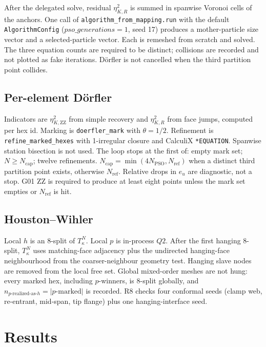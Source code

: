 \documentclass[applsci,article,submit,pdftex,oneauthor]{Definitions/mdpi}
\begin{document}
After the delegated solve, residual $\eta_{K,R}^2$ is summed in spanwise Voronoi cells of the anchors. One call of \texttt{algorithm\_from\_mapping.run} with the default \texttt{AlgorithmConfig} ($pso\_generations=1$, seed 17) produces a mother-particle size vector and a selected-particle vector. Each is remeshed from scratch and solved. The three equation counts are required to be distinct; collisions are recorded and not plotted as fake iterations. D{\"o}rfler is not cancelled when the third partition point collides.

\subsection{Per-element D{\"o}rfler}

Indicators are $\eta_{K,\mathrm{ZZ}}^2$ from simple recovery and $\eta_{K,R}^2$ from face jumps, computed per hex id. Marking is \texttt{doerfler\_mark} with $\theta=1/2$. Refinement is \texttt{refine\_marked\_hexes} with 1-irregular closure and CalculiX \texttt{*EQUATION}. Spanwise station bisection is not used. The loop stops at the first of: empty mark set; $N\ge N_{\mathrm{cap}}$; twelve refinements. $N_{\mathrm{cap}}=\min(4N_{\mathrm{PSO}},N_{\mathrm{ref}})$ when a distinct third partition point exists, otherwise $N_{\mathrm{ref}}$. Relative drops in $e_u$ are diagnostic, not a stop. G01 ZZ is required to produce at least eight points unless the mark set empties or $N_{\mathrm{ref}}$ is hit.

\subsection{Houston--Wihler}

Local $h$ is an 8-split of $T_\kappa^N$. Local $p$ is in-process $Q2$. After the first hanging 8-split, $T_\kappa^N$ uses matching-face adjacency plus the undirected hanging-face neighbourhood from the coarser-neighbour geometry test. Hanging slave nodes are removed from the local free set. Global mixed-order meshes are not hung: every marked hex, including $p$-winners, is 8-split globally, and $n_{p\text{-realized-as-}h}=|p\text{-marked}|$ is recorded. R8 checks four conformal seeds (clamp web, re-entrant, mid-span, tip flange) plus one hanging-interface seed.

\section{Results}
\label{sec:results}
\end{document}
